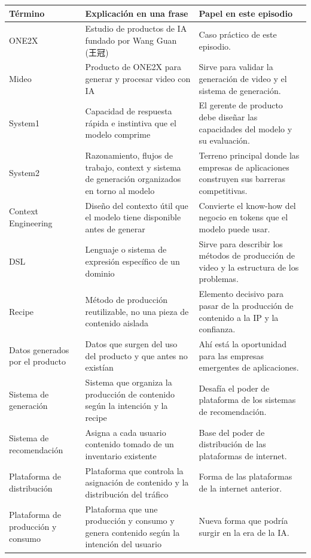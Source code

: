 \documentclass[a4paper]{article}
\begin{document}
\begin{longtable}{p{}p{}p{}}
\toprule
Término & Explicación en una frase & Papel en este episodio \\
\midrule
ONE2X & Estudio de productos de IA fundado por Wang Guan (王冠) & Caso práctico de este episodio. \\
Mideo & Producto de ONE2X para generar y procesar video con IA & Sirve para validar la generación de video y el sistema de generación. \\
System1 & Capacidad de respuesta rápida e instintiva que el modelo comprime & El gerente de producto debe diseñar las capacidades del modelo y su evaluación. \\
System2 & Razonamiento, flujos de trabajo, context y sistema de generación organizados en torno al modelo & Terreno principal donde las empresas de aplicaciones construyen sus barreras competitivas. \\
Context Engineering & Diseño del contexto útil que el modelo tiene disponible antes de generar & Convierte el know-how del negocio en tokens que el modelo puede usar. \\
DSL & Lenguaje o sistema de expresión específico de un dominio & Sirve para describir los métodos de producción de video y la estructura de los problemas. \\
Recipe & Método de producción reutilizable, no una pieza de contenido aislada & Elemento decisivo para pasar de la producción de contenido a la IP y la confianza. \\
Datos generados por el producto & Datos que surgen del uso del producto y que antes no existían & Ahí está la oportunidad para las empresas emergentes de aplicaciones. \\
Sistema de generación & Sistema que organiza la producción de contenido según la intención y la recipe & Desafía el poder de plataforma de los sistemas de recomendación. \\
Sistema de recomendación & Asigna a cada usuario contenido tomado de un inventario existente & Base del poder de distribución de las plataformas de internet. \\
Plataforma de distribución & Plataforma que controla la asignación de contenido y la distribución del tráfico & Forma de las plataformas de la internet anterior. \\
Plataforma de producción y consumo & Plataforma que une producción y consumo y genera contenido según la intención del usuario & Nueva forma que podría surgir en la era de la IA. \\

\end{longtable}
\end{document}

